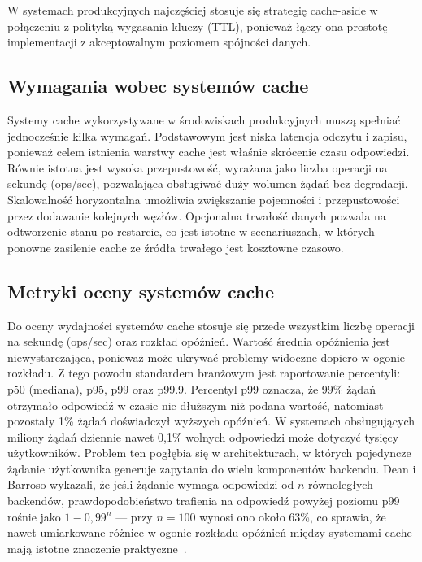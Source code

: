 W systemach produkcyjnych najczęściej stosuje się strategię cache-aside w połączeniu z polityką wygasania kluczy (TTL), ponieważ łączy ona prostotę implementacji z akceptowalnym poziomem spójności danych.

\subsection{Wymagania wobec systemów cache}

Systemy cache wykorzystywane w środowiskach produkcyjnych muszą spełniać jednocześnie kilka wymagań. Podstawowym jest niska latencja odczytu i zapisu, ponieważ celem istnienia warstwy cache jest właśnie skrócenie czasu odpowiedzi. Równie istotna jest wysoka przepustowość, wyrażana jako liczba operacji na sekundę (ops/sec), pozwalająca obsługiwać duży wolumen żądań bez degradacji. Skalowalność horyzontalna umożliwia zwiększanie pojemności i przepustowości przez dodawanie kolejnych węzłów. Opcjonalna trwałość danych pozwala na odtworzenie stanu po restarcie, co jest istotne w scenariuszach, w których ponowne zasilenie cache ze źródła trwałego jest kosztowne czasowo.

\subsection{Metryki oceny systemów cache}

Do oceny wydajności systemów cache stosuje się przede wszystkim liczbę operacji na sekundę (ops/sec) oraz rozkład opóźnień. Wartość średnia opóźnienia jest niewystarczająca, ponieważ może ukrywać problemy widoczne dopiero w ogonie rozkładu. Z tego powodu standardem branżowym jest raportowanie percentyli: p50 (mediana), p95, p99 oraz p99.9. Percentyl p99 oznacza, że 99\% żądań otrzymało odpowiedź w czasie nie dłuższym niż podana wartość, natomiast pozostały 1\% żądań doświadczył wyższych opóźnień. W systemach obsługujących miliony żądań dziennie nawet 0{,}1\% wolnych odpowiedzi może dotyczyć tysięcy użytkowników. Problem ten pogłębia się w architekturach, w których pojedyncze żądanie użytkownika generuje zapytania do wielu komponentów backendu. Dean i Barroso wykazali, że jeśli żądanie wymaga odpowiedzi od $n$ równoległych backendów, prawdopodobieństwo trafienia na odpowiedź powyżej poziomu p99 rośnie jako $1 - 0{,}99^n$ --- przy $n = 100$ wynosi ono około 63\%, co sprawia, że nawet umiarkowane różnice w ogonie rozkładu opóźnień między systemami cache mają istotne znaczenie praktyczne~\cite{dean2013}.


